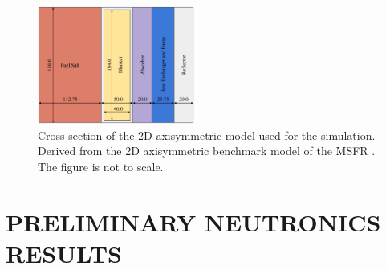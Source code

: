 \documentclass{anstrans}
\begin{document}
\begin{figure}[h] 
	\centering
	\includegraphics[width=0.46\textwidth]{./figures/benchmark}
	\captionsetup{justification=centering}
	\caption{Cross-section of the 2D axisymmetric model used for the simulation. Derived from the 2D axisymmetric benchmark model of the MSFR \cite{pettersen_coupled_2016}. The figure is not to scale.}
	\label{fig:benchmark}
\end{figure} 

\section{PRELIMINARY NEUTRONICS RESULTS}




\end{document}
